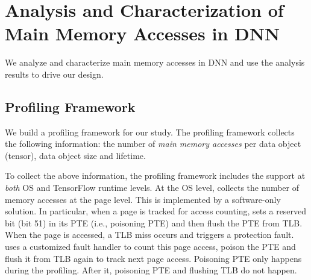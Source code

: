 \section{Analysis and Characterization of Main Memory Accesses in DNN}
\label{sec:char}
We analyze and characterize main memory accesses in DNN and use the analysis results to drive our design.


\subsection{Profiling Framework}
\label{sec:profiling_framework}


We build a profiling framework for our study.
The profiling framework collects the following information: the number of \textit{main memory accesses} per data object (tensor), data object size and lifetime. 

To collect the above information, the profiling framework includes the support at \textit{both} OS and TensorFlow runtime levels. At the OS level, \name collects the number of memory accesses at the page level. This is implemented by a software-only solution. In particular, when a page is tracked for access counting, \name sets a reserved bit (bit 51) in its PTE (i.e., poisoning PTE) and then flush the PTE from TLB. When the page is accessed, a TLB miss occurs and triggers a protection fault. \name uses a customized fault handler to count this page access, poison the PTE and flush it from TLB again to track next page access. Poisoning PTE only happens during the profiling. After it, poisoning PTE and flushing TLB do not happen. 



